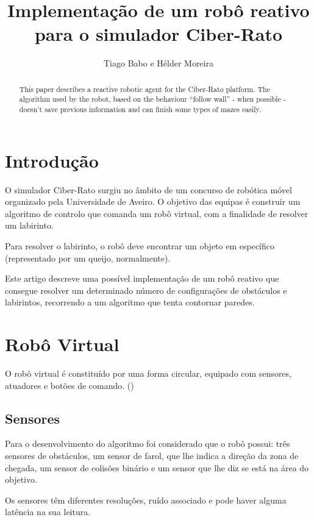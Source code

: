 \documentclass[citeauthoryear]{llncs} %
\begin{document}
\title{Implementação de um robô reativo para o simulador Ciber-Rato}
\author{Tiago Babo e Hélder Moreira}


\maketitle

\begin{abstract}
This paper describes a reactive robotic agent for the Ciber-Rato platform. The algorithm used by the robot, based on the behaviour “follow wall” - when possible - doesn't save previous information and can finish some types of mazes easily.
\end{abstract}

\section{Introdução}
O simulador Ciber-Rato surgiu no âmbito de um concurso de robótica móvel organizado pela Universidade de Aveiro. O objetivo das equipas é construir um algoritmo de controlo que comanda um robô virtual, com a finalidade de resolver um labirinto. 

Para resolver o labirinto, o robô deve encontrar um objeto em específico (representado por um queijo, normalmente).

Este artigo descreve uma possível implementação de um robô reativo que consegue resolver um determinado número de configurações de obstáculos e labirintos, recorrendo a um algoritmo que tenta contornar paredes. 

\section{Robô Virtual}

O robô virtual é constituído por uma forma circular, equipado com sensores, atuadores e botões de comando. (\cite{microrato})

\subsection{Sensores}
Para o desenvolvimento do algoritmo foi considerado que o robô possui: três sensores de obstáculos, um sensor de farol, que lhe indica a direção da zona de chegada, um sensor de colisões binário e um sensor que lhe diz se está na área do objetivo. 

Os sensores têm diferentes resoluções, ruído associado e pode haver alguma latência na sua leitura.
\end{document}
